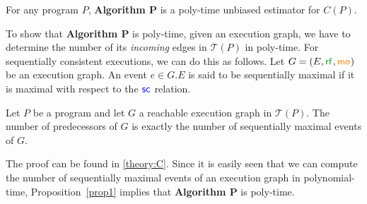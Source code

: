 \begin{proposition}
For any program $P$, \textbf{Algorithm P} is a poly-time unbiased estimator for $C(P)$.
\end{proposition}


To show that \textbf{Algorithm P} is poly-time, given an execution graph, we have to determine the number of its \emph{incoming} edges in $\mathcal{T}(P)$ in poly-time.
For sequentially consistent executions, we can do this as follows.
Let $G=(E,\rf{},\mo{})$ be an execution graph.
An event $e\in G.E$ is said to be sequentially maximal if it is maximal with respect to the ${\textcolor{blue}{\mathsf{sc}}_{}}$ relation. 

\begin{proposition}
\label{prop1}
Let $P$ be a program and let $G$ a reachable execution graph in $\mathcal{T}(P)$. 
The number of predecessors of $G$ is exactly the number of sequentially maximal events of $G$. 
\end{proposition}

The proof can be found in \cref{theory:C}.
Since it is easily seen that we can compute the number of sequentially maximal events of an execution graph in polynomial-time,
Proposition~\ref{prop1} implies that \textbf{Algorithm P} is poly-time.

% 

